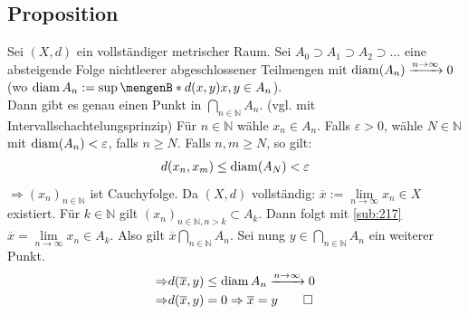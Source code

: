 \subsection[Proposition: \glqq Intervallschachtelungsprinzip\grqq in metrischen Räumen]{Proposition} %
\label{sub:218}
Sei $(X,d)$ ein vollständiger metrischer Raum. Sei $A_0 \supset A_1 \supset A_2 \supset \ldots $ eine absteigende Folge nichtleerer abgeschlossener Teilmengen mit 
$\operatorname{diam} (A_n) \xrightarrow{n \to \infty} 0 $ (wo $\diam A_n := \sup \set[d(x,y)]{x,y \in A_n} $). \\
Dann gibt es genau einen Punkt in $\bigcap_{n \in \mathds{N}} A_n$. \hfill {\footnotesize (vgl. mit Intervallschachtelungsprinzip)}
Für $n \in \mathds{N}$ wähle $x_n \in A_n$. Falls $\varepsilon >0$, wähle $N \in \mathds{N}$ mit $\operatorname{diam}(A_n) < \varepsilon$, falls $n \ge N$. Falls $n,m \ge N$, so
gilt:
\begin{align*}
	d(x_n, x_m) \le \operatorname{diam}(A_N) < \varepsilon
\end{align*}
$\Rightarrow (x_n)_{n \in \mathds{N}}$ ist Cauchyfolge. Da $(X,d)$ vollständig: $\overline{x} := \lim\limits_{ n \to \infty} x_n \in X $ existiert. Für $k \in \mathds{N}$
gilt $(x_n)_{n \in \mathds{N}, n >k} \subset A_k$. Dann folgt mit \ref{sub:217} $\overline{x} = \lim\limits_{ n \to \infty} x_n \in A_k$. Also gilt
$\overline{x} \bigcap_{n \in \mathds{N}} A_n $. Sei nung $y \in \bigcap_{n \in \mathds{N}} A_n$ ein weiterer Punkt. 
\begin{align*}
	\Rightarrow & d(\overline{x}, y ) \le \operatorname{diam} A_n \xrightarrow{n \to \infty} 0 \\
	\Rightarrow & d(\overline{x}, y ) = 0 \Rightarrow \overline{x} = y \tag*{$\square$} 
\end{align*}

